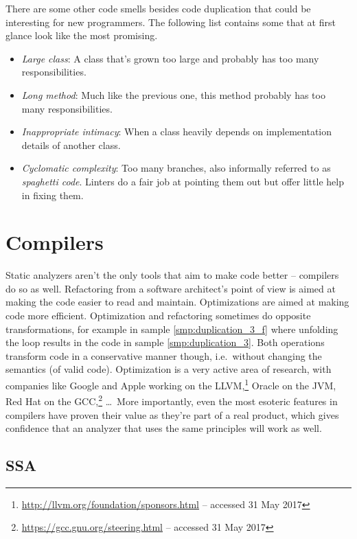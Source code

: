 \documentclass[a4paper, 16pt, oneside]{Thesis}
\providecommand{\tightlist}{%
  \setlength{\itemsep}{0pt}\setlength{\parskip}{0pt}}
\begin{document}
There are some other code smells besides code duplication that could be
interesting for new programmers. The following list contains some that
at first glance look like the most promising.

\begin{itemize}
\tightlist
\item
  \emph{Large class}: A class that's grown too large and probably has
  too many responsibilities.
\item
  \emph{Long method}: Much like the previous one, this method probably
  has too many responsibilities.
\item
  \emph{Inappropriate intimacy}: When a class heavily depends on
  implementation details of another class.
\item
  \emph{Cyclomatic complexity}: Too many branches, also informally
  referred to as \emph{spaghetti code}. Linters do a fair job at
  pointing them out but offer little help in fixing them.
\end{itemize}

\section{Compilers}\label{compilers}

Static analyzers aren't the only tools that aim to make code better --
compilers do so as well. Refactoring from a software architect's point
of view is aimed at making the code easier to read and maintain.
Optimizations are aimed at making code more efficient. Optimization and
refactoring sometimes do opposite transformations, for example in sample
\ref{smp:duplication_3_f} where unfolding the loop results in the code
in sample \ref{smp:duplication_3}. Both operations transform code in a
conservative manner though, i.e.~without changing the semantics (of
valid code). Optimization is a very active area of research, with
companies like Google and Apple working on the LLVM,\footnote{\url{http://llvm.org/foundation/sponsors.html}
  -- accessed 31 May 2017} Oracle on the JVM, Red Hat on the
GCC,\footnote{\url{https://gcc.gnu.org/steering.html} -- accessed 31 May
  2017} \ldots ~More importantly, even the most esoteric features in
compilers have proven their value as they're part of a real product,
which gives confidence that an analyzer that uses the same principles
will work as well.

\subsection{SSA}\label{ssa}
\end{document}
